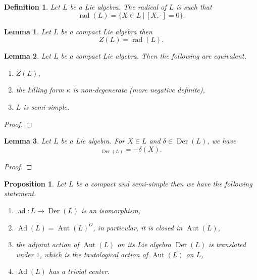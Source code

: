 \documentclass{article}
\newtheorem{proposition}{Proposition}[section]
\newtheorem{definition}{Definition}[section]
\newtheorem{lemma}{Lemma}[section]
\numberwithin{equation}{section}
\DeclareMathOperator{\Ad}{Ad}
\DeclareMathOperator{\ad}{ad}
\DeclareMathOperator{\Der}{Der}
\DeclareMathOperator{\Aut}{Aut}
\DeclareMathOperator{\rad}{rad}
\begin{document}
\begin{definition}
Let $L$ be a Lie algebra. The radical of $L$ is such that
\begin{equation*}
\rad(L) = \{X\in L\:|\: [X,\cdot]=0\}.
\end{equation*}
\end{definition}

\begin{lemma}
Let $L$ be a compact Lie algebra then
\begin{equation*}
Z(L) = \rad(L).
\end{equation*}
\end{lemma}

\begin{lemma}
Let $L$ be a compact Lie algebra. Then the following are equivalent.
\begin{enumerate}
\item $Z(L)$,
\item the killing form $\kappa$ is non-degenerate (more negative definite),
\item $L$ is semi-simple.
\end{enumerate}
\end{lemma}

\begin{proof}
\end{proof}

\begin{lemma}
Let $L$ be a Lie algebra. For $X\in L$ and $\delta\in \Der(L)$, we have
\begin{equation*}
[X,\delta]_{\Der(L)} = -\delta(X).
\end{equation*}
\end{lemma}

\begin{proof}
\end{proof}

\begin{proposition}
Let $L$ be a compact and semi-simple then we have the following statement.
\begin{enumerate}
\item $\ad:L\to\Der(L)$ is an isomorphism,
\item $\Ad(L)=\Aut(L)^O$, in particular, it is closed in $\Aut(L)$,
\item the adjoint action of $\Aut(L)$ on its Lie algebra $\Der(L)$ is translated under $1$, which is the tautological action of $\Aut(L)$ on $L$,
\item $\Ad(L)$ has a trivial center.
\end{enumerate}
\end{proposition}
\end{document}
